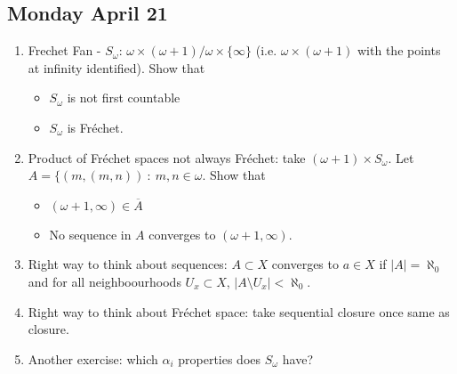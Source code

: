 \documentclass{article}
\begin{document}
\subsection*{Monday April 21} 
\begin{enumerate}
    \item Frechet Fan - \(S_{\omega}\): \(\omega \times (\omega + 1) / \omega \times \{\infty\}\) (i.e. \(\omega \times ( \omega + 1)\) with the points at infinity identified). Show that 
    \begin{itemize}
        \item \(S_{\omega}\) is not first countable \checkmark
        \item \(S_{\omega}\) is Fréchet. \checkmark
    \end{itemize}

    \item Product of Fréchet spaces not always Fréchet: take \((\omega + 1) \times S_{\omega}\). Let \(A = \{(m, (m, n)) \: : \: m,n \in \omega\). Show that 
    \begin{itemize}
        \item \((\omega + 1, \infty) \in \overline{A}\) \checkmark
        \item No sequence in \(A\) converges to \((\omega + 1, \infty)\). \checkmark
    \end{itemize}

    \item Right way to think about sequences: \(A \subset X\) converges to \(a \in X\) if \(|A| = \aleph_0\) and for all neighboourhoods \(U_x \subset X\), \(|A \setminus U_x| < \aleph_0\).
    
    \item Right way to think about Fréchet space: take sequential closure once same as closure.
    \item Another exercise: which \(\alpha_i\) properties does \(S_{\omega}\) have? \checkmark
\end{enumerate}
\end{document}
